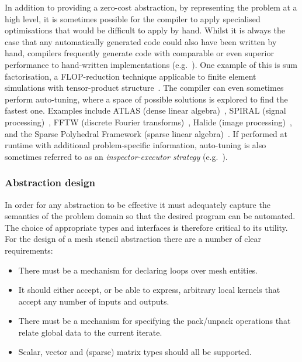 \documentclass[thesis]{subfiles}
\begin{document}
In addition to providing a zero-cost abstraction, by representing the problem at a high level, it is sometimes possible for the compiler to apply specialised optimisations that would be difficult to apply by hand.
Whilst it is always the case that any automatically generated code could also have been written by hand, compilers frequently generate code with comparable or even superior performance to hand-written implementations (e.g.~\cite{ragan-kelleyHalideLanguageCompiler}).
One example of this is sum factorisation, a FLOP-reduction technique applicable to finite element simulations with tensor-product structure~\cite{homolyaExposingExploitingStructure2017}.
The compiler can even sometimes perform auto-tuning, where a space of possible solutions is explored to find the fastest one.
Examples include ATLAS (dense linear algebra)~\cite{whaleyAutomatedEmpiricalOptimizations2001}, SPIRAL (signal processing)~\cite{puschelSPIRALCodeGeneration2005}, FFTW (discrete Fourier transforms)~\cite{frigoDesignImplementationFFTW32005}, Halide (image processing)~\cite{ragan-kelleyHalideLanguageCompiler}, and the Sparse Polyhedral Framework (sparse linear algebra)~\cite{stroutSparsePolyhedralFramework2018}.
If performed at runtime with additional problem-specific information, auto-tuning is also sometimes referred to as an \emph{inspector-executor strategy} (e.g.~\cite{saltzRunTimeParallelizationScheduling,kriegerLoopChainingProgramming2013}).

\subsubsection{Abstraction design}

In order for any abstraction to be effective it must adequately capture the semantics of the problem domain so that the desired program can be automated.
The choice of appropriate types and interfaces is therefore critical to its utility.
For the design of a mesh stencil abstraction there are a number of clear requirements:
\begin{itemize}
  \item There must be a mechanism for declaring loops over mesh entities.
  \item It should either accept, or be able to express, arbitrary local kernels that accept any number of inputs and outputs.
  \item There must be a mechanism for specifying the pack/unpack operations that relate global data to the current iterate.
  \item Scalar, vector and (sparse) matrix types should all be supported.
\end{itemize}
\end{document}
